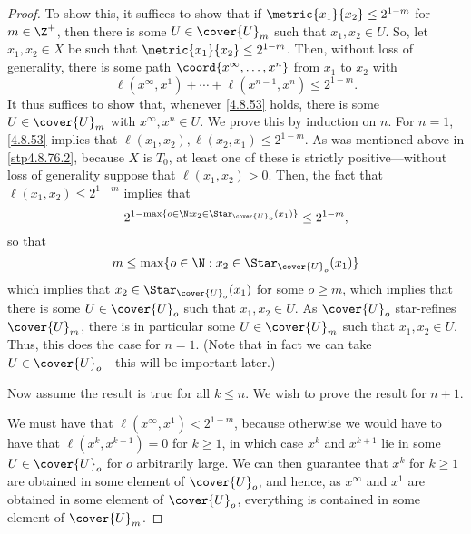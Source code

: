 \begin{thm}{}{}
\begin{proof}
To show this, it suffices to show that if $\metric{x_1}{x_2}\leq 2^{1-m}$ for $m\in \Z ^+$, then there is some $U\in \cover{U}_m$ such that $x_1,x_2\in U$.  So, let $x_1,x_2\in X$ be such that $\metric{x_1}{x_2}\leq 2^{1-m}$.  Then, without loss of generality, there is some path $\coord{x^\infty,\ldots ,x^n}$ from $x_1$ to $x_2$ with
\begin{equation}\label{4.8.53}
\ell (x^\infty,x^1)+\cdots +\ell (x^{n-1},x^n)\leq 2^{1-m}.
\end{equation}
It thus suffices to show that, whenever \eqref{4.8.53} holds, there is some $U\in \cover{U}_m$ with $x^\infty,x^n\in U$.  We prove this by induction on $n$.  For $n=1$, \eqref{4.8.53} implies that $\ell (x_1,x_2),\ell (x_2,x_1)\leq 2^{1-m}$.  As was mentioned above in \cref{stp4.8.76.2}, because $X$ is $T_0$, at least one of these is strictly positive---without loss of generality suppose that $\ell (x_1,x_2)>0$.  Then, the fact that $\ell (x_1,x_2)\leq 2^{1-m}$ implies that
\begin{equation}
2^{1-\max \{ o\in \N :x_2\in \Star _{\cover{U}_o}(x_1)\}}\leq 2^{1-m},
\end{equation}
so that
\begin{equation}
m\leq \max \{ o\in \N :x_2\in \Star _{\cover{U}_o}(x_1)\} 
\end{equation}
which implies that $x_2\in \Star _{\cover{U}_{o}}(x_1)$ for some $o\geq m$, which implies that there is some $U\in \cover{U}_{o}$ such that $x_1,x_2\in U$.  As $\cover{U}_o$ star-refines $\cover{U}_m$, there is in particular some $U\in \cover{U}_m$ such that $x_1,x_2\in U$.  Thus, this does the case for $n=1$.  (Note that in fact we can take $U\in \cover{U}_{o}$---this will be important later.)

Now assume the result is true for all $k\leq n$.  We wish to prove the result for $n+1$.

We must have that $\ell (x^\infty,x^1)<2^{1-m}$, because otherwise we would have to have that $\ell (x^k,x^{k+1})=0$ for $k\geq 1$, in which case $x^k$ and $x^{k+1}$ lie in some $U\in \cover{U}_o$ for $o$ arbitrarily large.  We can then guarantee that $x^k$ for $k\geq 1$ are obtained in some element of $\cover{U}_{o}$, and hence, as $x^\infty$ and $x^1$ are obtained in some element of $\cover{U}_{o}$, everything is contained in some element of $\cover{U}_m$.


\end{proof}
\end{thm}
